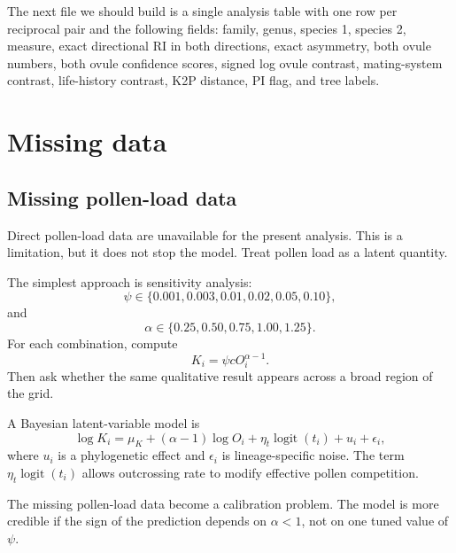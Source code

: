 \documentclass[12pt]{article}
\newcommand{\logit}{\operatorname{logit}}
\begin{document}
\begin{conclusionbox}
The next file we should build is a single analysis table with one row per reciprocal pair and the following fields: family, genus, species 1, species 2, measure, exact directional RI in both directions, exact asymmetry, both ovule numbers, both ovule confidence scores, signed log ovule contrast, mating-system contrast, life-history contrast, K2P distance, PI flag, and tree labels.
\end{conclusionbox}

\section{Missing data}

\subsection{Missing pollen-load data}

Direct pollen-load data are unavailable for the present analysis. This is a limitation, but it does not stop the model. Treat pollen load as a latent quantity.

The simplest approach is sensitivity analysis:
\begin{equation}
\psi\in\{0.001,0.003,0.01,0.02,0.05,0.10\},
\end{equation}
and
\begin{equation}
\alpha\in\{0.25,0.50,0.75,1.00,1.25\}.
\end{equation}
For each combination, compute
\begin{equation}
K_i=\psi cO_i^{\alpha-1}.
\end{equation}
Then ask whether the same qualitative result appears across a broad region of the grid.

A Bayesian latent-variable model is
\begin{equation}
\log K_i=\mu_K+(\alpha-1)\log O_i+\eta_t\logit(t_i)+u_i+\epsilon_i,
\label{eq:latentK}
\end{equation}
where $u_i$ is a phylogenetic effect and $\epsilon_i$ is lineage-specific noise. The term $\eta_t\logit(t_i)$ allows outcrossing rate to modify effective pollen competition.

\begin{conclusionbox}
The missing pollen-load data become a calibration problem. The model is more credible if the sign of the prediction depends on $\alpha<1$, not on one tuned value of $\psi$.
\end{conclusionbox}
\end{document}
